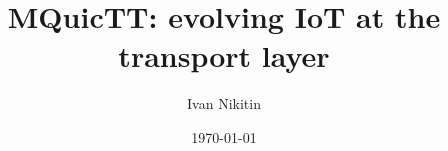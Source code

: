 \documentclass{l4proj}
\begin{document}
\makeatletter
\patchcmd{\NAT@test}{\else \NAT@nm}{\else \NAT@nmfmt{\NAT@nm}}{}{}

\DeclareRobustCommand\citepos
{\begingroup
    \let\NAT@nmfmt\NAT@posfmt
    \NAT@swafalse\let\NAT@ctype\z@\NAT@partrue
    \@ifstar{\NAT@fulltrue\NAT@citetp}{\NAT@fullfalse\NAT@citetp}}

\let\NAT@orig@nmfmt\NAT@nmfmt
\def\NAT@posfmt#1{
    \StrRemoveBraces{#1}[\NAT@temp]
    \IfEndWith{\NAT@temp}{s}
    {\NAT@orig@nmfmt{#1'}}
    {\NAT@orig@nmfmt{#1's}}}

\makeatother

\title{MQuicTT: evolving IoT at the transport layer}
\author{Ivan Nikitin}
\date{\today}

\maketitle



\def\consentname {Ivan Nikitin} %
\def\consentdate {25 March 2022} %
\educationalconsent


\tableofcontents








\begin{appendices}
    
    
\end{appendices}


\end{document}
